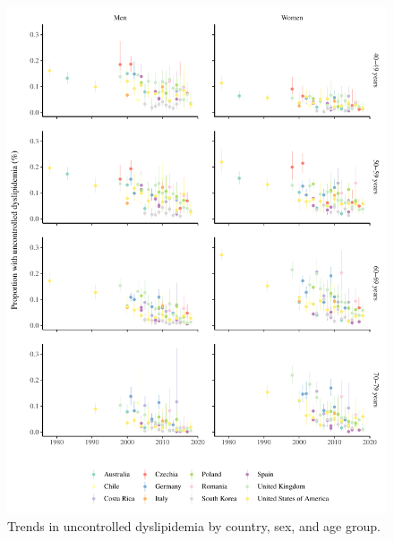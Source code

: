 \documentclass[12pt]{article}
\begin{document}
\begin{figure}[hp]
    \centering
    \includegraphics[width=\textwidth]{../3_figures/fig4_severe.pdf}
    \caption{Trends in uncontrolled dyslipidemia by country, sex, and age group.}
    \label{fig:severe}
\end{figure}
\end{document}
